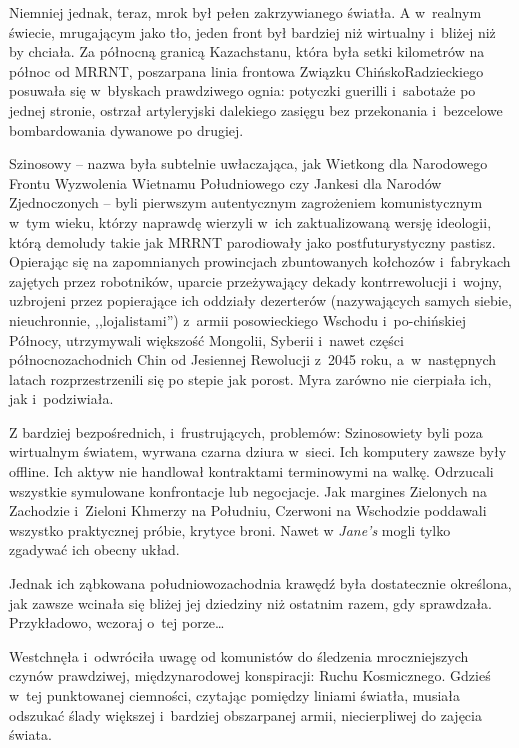 \documentclass[oneside,polish,11pt,sfheadings]{mwbk}
\begin{document}
Niemniej jednak, teraz, mrok był pełen zakrzywianego światła. A w~realnym świecie, mrugającym jako tło, jeden front był bardziej niż
wirtualny i~bliżej niż by chciała. Za północną granicą Kazachstanu,
która była setki kilometrów na północ od MRRNT, poszarpana linia
frontowa Związku Chińsko\dywiz Radzieckiego posuwała się w~błyskach
prawdziwego ognia: potyczki guerilli i~sabotaże po jednej stronie,
ostrzał artyleryjski dalekiego zasięgu bez przekonania i~bezcelowe
bombardowania dywanowe po drugiej.

Szinosowy -- nazwa była subtelnie uwłaczająca, jak Wietkong dla
Narodowego Frontu Wyzwolenia Wietnamu Południowego czy Jankesi dla
Narodów Zjednoczonych -- byli pierwszym autentycznym zagrożeniem
komunistycznym w~tym wieku, którzy naprawdę wierzyli w~ich
zaktualizowaną wersję ideologii, którą demoludy takie jak MRRNT
parodiowały jako postfuturystyczny pastisz. Opierając się na
zapomnianych prowincjach zbuntowanych kołchozów i~fabrykach zajętych
przez robotników, uparcie przeżywający dekady kontrrewolucji i~wojny,
uzbrojeni przez popierające ich oddziały dezerterów (nazywających
samych siebie, nieuchronnie, ,,lojalistami'') z~armii posowieckiego Wschodu i~po-chińskiej Północy, utrzymywali większość Mongolii, Syberii i~nawet
części północno\dywiz zachodnich Chin od Jesiennej Rewolucji z~2045 roku, a~w~następnych latach rozprzestrzenili się po stepie jak porost. Myra
zarówno nie cierpiała ich, jak i~podziwiała.

Z bardziej bezpośrednich, i~frustrujących, problemów: Szinosowiety byli
poza wirtualnym światem, wyrwana czarna dziura w~sieci. Ich komputery
zawsze były offline. Ich aktyw nie handlował kontraktami terminowymi na
walkę. Odrzucali wszystkie symulowane konfrontacje lub negocjacje. Jak
margines Zielonych na Zachodzie i~Zieloni Khmerzy na Południu, Czerwoni
na Wschodzie poddawali wszystko praktycznej próbie, krytyce broni. Nawet
w \textit{Jane's} mogli tylko zgadywać ich obecny układ.

Jednak ich ząbkowana południowo\dywiz zachodnia krawędź była dostatecznie
określona, jak zawsze wcinała się bliżej jej dziedziny niż ostatnim
razem, gdy sprawdzała. Przykładowo, wczoraj o~tej porze\ldots

Westchnęła i~odwróciła uwagę od komunistów do śledzenia mroczniejszych
czynów prawdziwej, międzynarodowej konspiracji: Ruchu Kosmicznego.
Gdzieś w~tej punktowanej ciemności, czytając pomiędzy liniami światła,
musiała odszukać ślady większej i~bardziej obszarpanej armii,
niecierpliwej do zajęcia świata.
\end{document}
